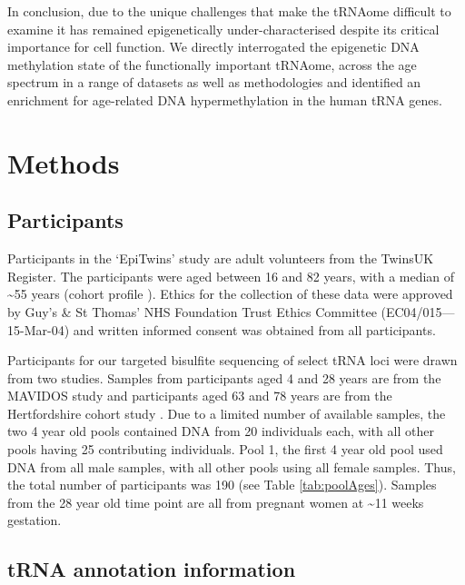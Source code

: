 \documentclass[]{book}
\begin{document}
In conclusion, due to the unique challenges that make the tRNAome difficult to examine it has remained epigenetically under-characterised despite its critical importance for cell function.
We directly interrogated the epigenetic DNA methylation state of the functionally important tRNAome, across the age spectrum in a range of datasets as well as methodologies and identified an enrichment for age-related DNA hypermethylation in the human tRNA genes.

\newpage

\hypertarget{Methods}{%
\section{Methods}\label{Methods}}

\hypertarget{participants}{%
\subsection{Participants}\label{participants}}

Participants in the `EpiTwins' study are adult volunteers from the TwinsUK Register.
The participants were aged between 16 and 82 years, with a median of \textasciitilde55 years (cohort profile \citep{Moayyeri2013}).
Ethics for the collection of these data were approved by Guy's \& St Thomas' NHS Foundation Trust Ethics Committee (EC04/015---15-Mar-04) and written informed consent was obtained from all participants.

Participants for our targeted bisulfite sequencing of select tRNA loci were drawn from two studies.
Samples from participants aged 4 and 28 years are from the MAVIDOS \citep{Harvey2012a} study and participants aged 63 and 78 years are from the Hertfordshire cohort study \citep{Syddall2005}.
Due to a limited number of available samples, the two 4 year old pools contained DNA from 20 individuals each, with all other pools having 25 contributing individuals.
Pool 1, the first 4 year old pool used DNA from all male samples, with all other pools using all female samples.
Thus, the total number of participants was 190 (see Table \ref{tab:poolAges}).
Samples from the 28 year old time point are all from pregnant women at \textasciitilde11 weeks gestation.

\hypertarget{tRNAanno}{%
\subsection{tRNA annotation information}\label{tRNAanno}}
\end{document}
